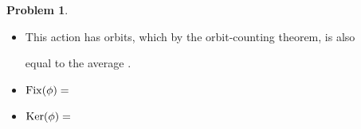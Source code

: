 \documentclass[12pt]{article}
\theoremstyle{definition} %
\newtheorem{problem}{Problem}
\begin{document}
\begin{problem}
\begin{enumerate}[(a)]
    \begin{itemize}
        
      \item This action has \uline{\hspace{.7in}} orbits, which by the
        orbit-counting theorem, is also \medskip

        equal to the average
        \uline{\hfill}.  \\ \smallskip
        
    \end{itemize}


    \begin{multicols}{2}
      \begin{itemize}
        
      \item $\operatorname{Fix}(\phi)=$ 

      \item $\operatorname{Ker}(\phi)=$ \\

      \end{itemize}
    \end{multicols}
  \end{enumerate}
\end{problem}
\end{document}
